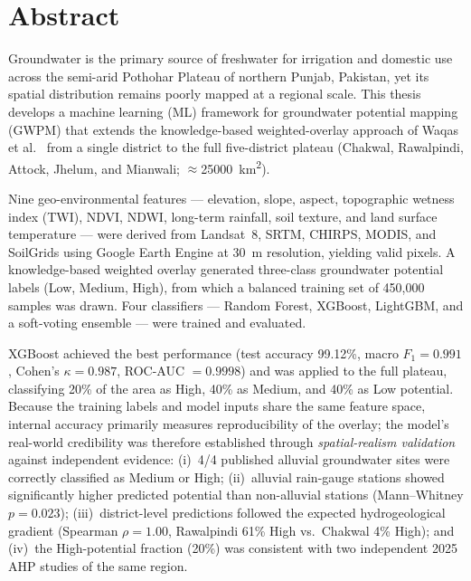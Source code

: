 \chapter*{Abstract}
\thispagestyle{plain}

Groundwater is the primary source of freshwater for irrigation and domestic
use across the semi-arid Pothohar Plateau of northern Punjab, Pakistan, yet
its spatial distribution remains poorly mapped at a regional scale. This
thesis develops a machine learning (ML) framework for groundwater potential
mapping (GWPM) that extends the knowledge-based weighted-overlay approach of
Waqas et al.\ \cite{waqas2022chakwal} from a single district to the full
five-district plateau (Chakwal, Rawalpindi, Attock, Jhelum, and Mianwali;
$\approx$\SI{25000}{\kilo\meter\squared}).

Nine geo-environmental features --- elevation, slope, aspect, topographic
wetness index (TWI), NDVI, NDWI, long-term rainfall, soil texture, and land
surface temperature --- were derived from Landsat~8, SRTM, CHIRPS, MODIS, and
SoilGrids using Google Earth Engine at 30~m resolution, yielding \npixels{}
valid pixels. A knowledge-based weighted overlay generated three-class
groundwater potential labels (Low, Medium, High), from which a balanced
training set of 450{,}000 samples was drawn. Four classifiers --- Random
Forest, XGBoost, LightGBM, and a soft-voting ensemble --- were trained and
evaluated.

XGBoost achieved the best performance (test accuracy 99.12\%, macro
$F_1=0.991$, Cohen's $\kappa=0.987$, ROC-AUC $=0.9998$) and was applied to
the full plateau, classifying 20\% of the area as High, 40\% as Medium, and
40\% as Low potential. Because the training labels and model inputs share
the same feature space, internal accuracy primarily measures reproducibility
of the overlay; the model's real-world credibility was therefore established
through \emph{spatial-realism validation} against independent evidence:
(i)~4/4 published alluvial groundwater sites were correctly classified as
Medium or High; (ii)~alluvial rain-gauge stations showed significantly higher
predicted potential than non-alluvial stations (Mann--Whitney $p=0.023$);
(iii)~district-level predictions followed the expected hydrogeological
gradient (Spearman $\rho=1.00$, Rawalpindi 61\% High vs.\ Chakwal 4\% High);
and (iv)~the High-potential fraction (20\%) was consistent with two
independent 2025 AHP studies of the same region.

